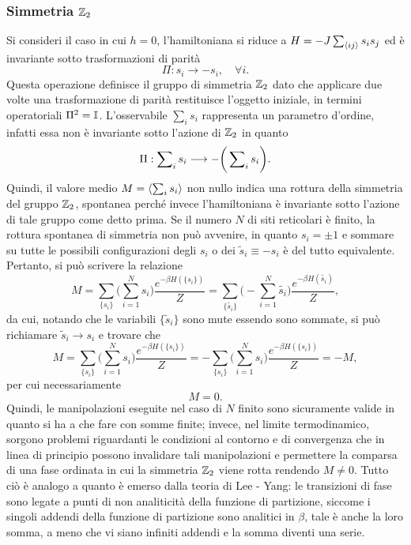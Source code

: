\subsubsection{Simmetria $\mathbb{Z}_2$}
Si consideri il caso in cui $h = 0$, l'hamiltoniana si riduce a $H = -J\sum_{\langle ij \rangle}s_is_j$ ed è invariante sotto trasformazioni di parità
\begin{equation}
    \Pi : s_i \longrightarrow -s_i,\quad \forall i.
\end{equation}
Questa operazione definisce il gruppo di simmetria $\mathbb{Z}_2$ dato che applicare due volte una trasformazione di parità restituisce l'oggetto iniziale, in termini operatoriali $\Pi^2 = \mathbb{I}$. L'osservabile $\sum_is_i$ rappresenta un parametro d'ordine, infatti essa non è invariante sotto l'azione di $\mathbb{Z}_2$ in quanto 
\begin{equation}
    \Pi : \sum\nolimits_is_i \longrightarrow -\bigg(\sum\nolimits_is_i\bigg).
\end{equation}
Quindi, il valore medio $M = \langle \sum\nolimits_is_i \rangle$ non nullo indica una rottura della simmetria del gruppo $\mathbb{Z}_2$, spontanea perché invece l'hamiltoniana è invariante sotto l'azione di tale gruppo come detto prima. Se il numero $N$ di siti reticolari è finito, la rottura spontanea di simmetria non può avvenire, in quanto $s_i = \pm 1$ e sommare su tutte le possibili configurazioni degli $s_i$ o dei $\tilde{s}_i \equiv -s_i$ è del tutto equivalente. Pertanto, si può scrivere la relazione
\begin{equation}
    M = \sum_{\{s_i\}}\bigg(\sum_{i=1}^N s_i\bigg)\frac{e^{-\beta H(\{s_i\})}}{Z} = \sum_{\{\tilde{s_i}\}}\bigg(-\sum_{i=1}^N \tilde{s_i}\bigg)\frac{e^{-\beta H(\tilde{s_i})}}{Z},
\end{equation}
da cui, notando che le variabili $\{\tilde{s}_i\}$ sono mute essendo sono sommate, si può richiamare $\tilde{s}_i \to s_i$ e trovare che
\begin{equation}
    M = \sum_{\{s_i\}}\bigg(\sum_{i=1}^N s_i\bigg)\frac{e^{-\beta H(\{s_i\})}}{Z} = -\sum_{\{s_i\}}\bigg(\sum_{i=1}^N s_i\bigg)\frac{e^{-\beta H(\{s_i\})}}{Z} = -M,
\end{equation}
per cui necessariamente
\begin{equation}
    M  = 0.
\end{equation}
Quindi, le manipolazioni eseguite nel caso di $N$ finito sono sicuramente valide in quanto si ha a che fare con somme finite; invece, nel limite termodinamico, sorgono problemi riguardanti le condizioni al contorno e di convergenza che in linea di principio possono invalidare tali manipolazioni e permettere la comparsa di una fase ordinata in cui la simmetria $\mathbb{Z}_2$ viene rotta rendendo $M \neq 0$. Tutto ciò è analogo a quanto è emerso dalla teoria di Lee - Yang: le transizioni di fase sono legate a punti di non analiticità della funzione di partizione, siccome i singoli addendi della funzione di partizione sono analitici in $\beta$, tale è anche la loro somma, a meno che vi siano infiniti addendi e la somma diventi una serie.

